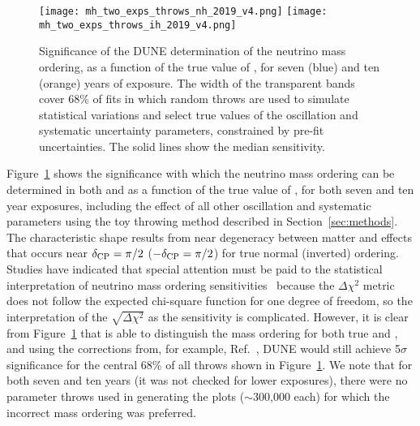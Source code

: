 \begin{figure}[htbp]
  \centering
  \texttt{[image: mh\_two\_exps\_throws\_nh\_2019\_v4.png]}
  \texttt{[image: mh\_two\_exps\_throws\_ih\_2019\_v4.png]}
  \caption[Significance of the DUNE neutrino mass ordering determination, as a function of \deltacp]{Significance of the DUNE determination of the neutrino mass ordering, as a function of the true value of \deltacp, for seven (blue) and ten (orange) years of exposure. The width of the transparent bands cover 68\% of fits in which random throws are used to simulate statistical variations and select true values of the oscillation and systematic uncertainty parameters, constrained by pre-fit uncertainties. The solid lines show the median sensitivity.}
  \label{fig:mh_nominal}
\end{figure}
Figure~\ref{fig:mh_nominal} shows the significance with which the neutrino mass ordering can be determined in both  and  as a function of the true value of \deltacp, for both seven and ten year exposures, including the effect of all other oscillation and systematic parameters using the toy throwing method described in Section~\ref{sec:methods}. The characteristic shape results from near degeneracy between matter and  effects that occurs near $\delta_{\rm CP}=\pi/2$ ($-\delta_{\rm CP}=\pi/2$) for true normal (inverted) ordering. Studies have indicated that special attention must be paid to the statistical interpretation of neutrino mass ordering sensitivities~\cite{Ciuffoli:2013rza,Qian:2012zn,Blennow:2013oma} because the $\Delta\chi^2$ metric does not follow the expected chi-square function for one degree of freedom, so the interpretation of the $\sqrt{\Delta \chi^{2}}$ as the sensitivity is complicated. However, it is clear from Figure~\ref{fig:mh_nominal} that  is able to distinguish the mass ordering for both true  and , and using the corrections from, for example, Ref.~\cite{Ciuffoli:2013rza}, DUNE would still achieve 5$\sigma$ significance for the central 68\% of all throws shown in Figure~\ref{fig:mh_nominal}. We note that for both seven and ten years (it was not checked for lower exposures), there were no parameter throws used in generating the plots ($\sim$300,000 each) for which the incorrect mass ordering was preferred.

